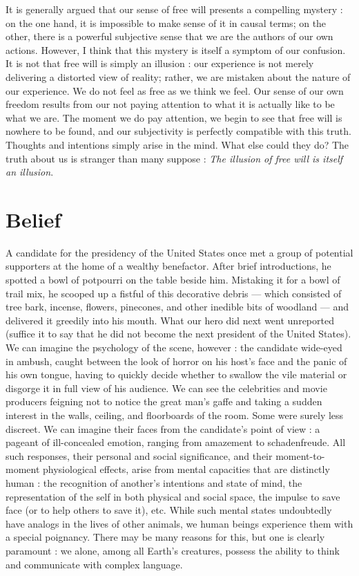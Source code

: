 \documentclass[a4paper,14pt]{extarticle}
\begin{document}
It is generally argued that our sense of free will presents a compelling mystery :
on the one hand, it is impossible to make sense of it in causal terms;
on the other, there is a powerful subjective sense that we are the authors of our own actions.
However, I think that this mystery is itself a symptom of our confusion.
It is not that free will is simply an illusion :
our experience is not merely delivering a distorted view of reality;
rather, we are mistaken about the nature of our experience.
We do not feel as free as we think we feel.
Our sense of our own freedom results from our not paying attention to what it is actually like to be what we are.
The moment we do pay attention, we begin to see that free will is nowhere to be found, and our subjectivity is perfectly compatible with this truth.
Thoughts and intentions simply arise in the mind.
What else could they do?
The truth about us is stranger than many suppose :
\textit{The illusion of free will is itself an illusion}.

\newpage
\section{Belief}

A candidate for the presidency of the United States once met a group of potential supporters at the home of a wealthy benefactor.
After brief introductions, he spotted a bowl of potpourri on the table beside him.
Mistaking it for a bowl of trail mix, he scooped up a fistful of this decorative debris --- which consisted of tree bark, incense, flowers, pinecones, and other inedible bits of woodland --- and delivered it greedily into his mouth.
What our hero did next went unreported (suffice it to say that he did not become the next president of the United States).
We can imagine the psychology of the scene, however :
the candidate wide-eyed in ambush, caught between the look of horror on his host’s face and the panic of his own tongue, having to quickly decide whether to swallow the vile material or disgorge it in full view of his audience.
We can see the celebrities and movie producers feigning not to notice the great man’s gaffe and taking a sudden interest in the walls, ceiling, and floorboards of the room.
Some were surely less discreet.
We can imagine their faces from the candidate’s point of view :
a pageant of ill-concealed emotion, ranging from amazement to schadenfreude.
All such responses, their personal and social significance, and their moment-to-moment physiological effects, arise from mental capacities that are distinctly human :
the recognition of another’s intentions and state of mind, the representation of the self in both physical and social space, the impulse to save face (or to help others to save it), etc.
While such mental states undoubtedly have analogs in the lives of other animals, we human beings experience them with a special poignancy.
There may be many reasons for this, but one is clearly paramount :
we alone, among all Earth’s creatures, possess the ability to think and communicate with complex language.
\end{document}
